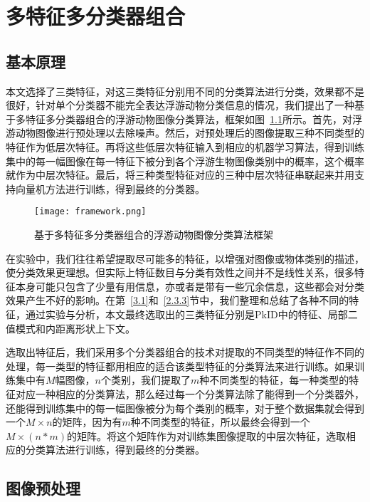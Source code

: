 \chapter{多特征多分类器组合}

\section{基本原理}

本文选择了三类特征，对这三类特征分别用不同的分类算法进行分类，效果都不是很好，针对单个分类器不能完全表达浮游动物分类信息的情况，我们提出了一种基于多特征多分类器组合的浮游动物图像分类算法，框架如图~\ref{fig: framework}所示。首先，对浮游动物图像进行预处理以去除噪声。然后，对预处理后的图像提取三种不同类型的特征作为低层次特征。再将这些低层次特征输入到相应的机器学习算法，得到训练集中的每一幅图像在每一特征下被分到各个浮游生物图像类别中的概率，这个概率就作为中层次特征。最后，将三种类型特征对应的三种中层次特征串联起来并用支持向量机方法进行训练，得到最终的分类器。

\begin{figure}[!ht]
\centering
\texttt{[image: framework.png]}
\caption{基于多特征多分类器组合的浮游动物图像分类算法框架}
\label{fig: framework}
\end{figure}

在实验中，我们往往希望提取尽可能多的特征，以增强对图像或物体类别的描述，使分类效果更理想。但实际上特征数目与分类有效性之间并不是线性关系，很多特征本身可能只包含了少量有用信息，亦或者是带有一些冗余信息，这些都会对分类效果产生不好的影响。在第~\ref{3.1}和~\ref{2.3.3}节中，我们整理和总结了各种不同的特征，通过实验与分析，本文最终选取出的三类特征分别是PkID中的特征、局部二值模式和内距离形状上下文。

选取出特征后，我们采用多个分类器组合的技术对提取的不同类型的特征作不同的处理，每一类型的特征都用相应的适合该类型特征的分类算法来进行训练。如果训练集中有$M$幅图像，$n$个类别，我们提取了$m$种不同类型的特征，每一种类型的特征对应一种相应的分类算法，那么经过每一个分类算法除了能得到一个分类器外，还能得到训练集中的每一幅图像被分为每个类别的概率，对于整个数据集就会得到一个$M \times n$的矩阵，因为有$m$种不同类型的特征，所以最终会得到一个$M \times (n * m)$的矩阵。将这个矩阵作为对训练集图像提取的中层次特征，选取相应的分类算法进行训练，得到最终的分类器。

\section{图像预处理}

